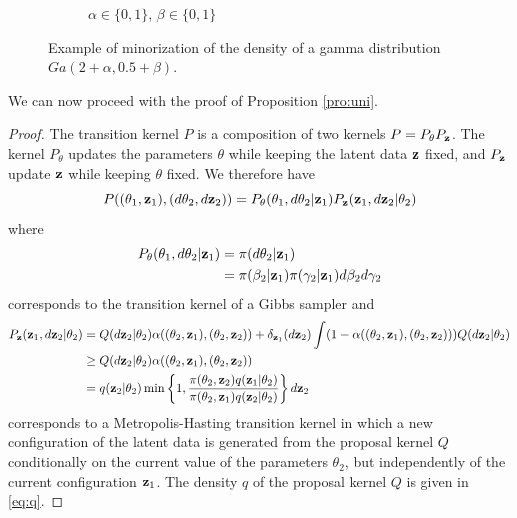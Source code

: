 \documentclass[11pt]{article}
\begin{document}
\begin{figure}
\begin{subfigure}[b]{0.32\textwidth}
			\caption{$\alpha \in \{0,1\}$, $\beta \in \{0,1\}$}
		\label{fig:gam2}
		\end{subfigure}
		\caption{Example of minorization of the density of a gamma distribution $Ga(2+\alpha, 0.5+\beta)$.}
		\label{fig:gam}
	\end{figure}
	
	We can now proceed with the proof of Proposition \ref{pro:uni}.
	
	\begin{proof}
		The transition kernel $P$ is a composition of two kernels $P = P_{\theta} P_{\mathbf{z}}$. The kernel $P_{\theta}$ updates the parameters $\theta$ while keeping the latent data $\mathbf{z}$ fixed, and $P_{\mathbf{z}}$ update $\mathbf{z}$ while keeping $\theta$ fixed. %
		We therefore have
		$$P((\theta_1, \mathbf{z}_1), (d\theta_2, d\mathbf{z}_2)) = P_\theta(\theta_1, d\theta_2 | \mathbf{z}_1) P_{\mathbf{z}}(\mathbf{z}_1, d\mathbf{z}_2 | \theta_2)$$
		where
		\begin{align}
		\label{eq:Pth}
		    P_\theta(\theta_1, d\theta_2 | \mathbf{z}_1)
		    & = \pi(d\theta_2 | \mathbf{z}_1) \\
		    & = \pi(\beta_2 | \mathbf{z}_1) \pi(\gamma_2 | \mathbf{z}_1) d\beta_2 d\gamma_2 \nonumber
		\end{align}
		corresponds to the transition kernel of a Gibbs sampler and
		\begin{align}
		\label{eq:Pz}
		    P_{\mathbf{z}}(\mathbf{z}_1, d\mathbf{z}_2 | \theta_2)
		    & = Q(d\mathbf{z}_2 | \theta_2) \alpha((\theta_2, \mathbf{z}_1),(\theta_2, \mathbf{z}_2)) + \delta_{\mathbf{z}_1}(d\mathbf{z}_2)\int(1-\alpha((\theta_2, \mathbf{z}_1),(\theta_2, \mathbf{z}_2))) Q(d\mathbf{z}_2| \theta_2) \nonumber \\
			& \ge Q(d\mathbf{z}_2| \theta_2) \alpha((\theta_2, \mathbf{z}_1),(\theta_2, \mathbf{z}_2)) \\
			& = q(\mathbf{z}_2| \theta_2) \min\left\lbrace 1, \dfrac{\pi(\theta_2, \mathbf{z}_2)q(\mathbf{z}_1| \theta_2)}{\pi(\theta_2, \mathbf{z}_1)q(\mathbf{z}_2| \theta_2)} \right\rbrace d\mathbf{z}_2 \nonumber
		\end{align}
		corresponds to a Metropolis-Hasting transition kernel in which a new configuration of the latent data is generated from the proposal kernel $Q$ conditionally on the current value of the parameters $\theta_2$, but independently of the current configuration $\mathbf{z}_1$. The density $q$ of the proposal kernel $Q$ is given in \eqref{eq:q}.
		

\end{proof}
\end{document}
